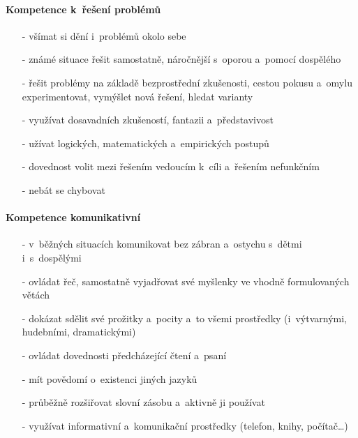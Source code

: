 				\paragraph{Kompetence k řešení problémů}
				\begin{itemize}
				\setlength\itemsep{-2mm}
				\item[-] všímat si dění i~problémů okolo sebe
				\item[-] známé situace řešit samostatně, náročnější s oporou a~pomocí dospělého
				\item[-] řešit problémy  na základě bezprostřední zkušenosti, cestou pokusu a~omylu experimentovat, vymýšlet nová řešení, hledat varianty
				\item[-] využívat dosavadních zkušeností, fantazii a~představivost 
				\item[-] užívat logických, matematických a~empirických postupů 
				\item[-] dovednost volit mezi řešením vedoucím k cíli a~řešením nefunkčním
				\item[-] nebát se chybovat
				\end{itemize}
				

				\paragraph{Kompetence komunikativní}
				\begin{itemize}
				\setlength\itemsep{-2mm}
				\item[-] v běžných situacích komunikovat bez zábran a~ostychu s dětmi i~s dospělými
				\item[-] ovládat řeč, samostatně vyjadřovat své myšlenky ve vhodně formulovaných větách
				\item[-] dokázat sdělit své prožitky a~pocity a~to všemi prostředky (i~výtvarnými, hudebními, dramatickými) 
				\item[-] ovládat dovednosti předcházející čtení a~psaní 
				\item[-] mít povědomí o~existenci jiných jazyků
				\item[-] průběžně rozšiřovat slovní zásobu a~aktivně ji používat
				\item[-] využívat informativní a~komunikační prostředky (telefon, knihy, počítač…)
				\end{itemize}

